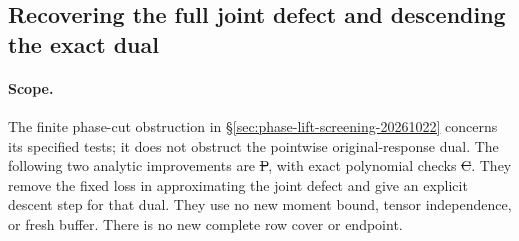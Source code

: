 \subsection{Recovering the full joint defect and descending the exact dual}
\label{sec:joint-dual-descent}
\paragraph{Scope.}
The finite phase-cut obstruction in
\S\ref{sec:phase-lift-screening-20261022} concerns its specified tests;
it does not obstruct the pointwise original-response dual.
The following two analytic improvements are \st{P}, with exact
polynomial checks \st{C}. They remove the fixed loss in approximating
the joint defect and give an explicit descent step for that dual.
They use no new moment bound, tensor independence, or fresh buffer.
There is no new complete row cover or endpoint.

